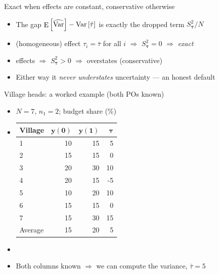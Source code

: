 \documentclass[table, xcolor = {dvipsnames}, 9pt]{beamer}
\theoremstyle{plain}
\newcommand{\mh}[1]{{\color{magenta}{#1}}}
\DeclareMathOperator{\E}{\rm{E}}
\DeclareMathOperator{\Var}{\rm{Var}}
\begin{document}
\begin{frame}[t]{Exact when effects are constant, conservative otherwise}
\vfill
\begin{itemize} \vfill
\item The gap $\E\left[\widehat{\Var}\right] - \Var\left[\hat{\tau}\right]$ is exactly the dropped term $S^2_{\bm{\tau}}/N$ \vfill
\item \mh{Constant} (homogeneous) effect $\tau_i = \bar{\tau}$ for all $i$ $\Rightarrow$ $S^2_{\bm{\tau}} = 0$ $\Rightarrow$ \emph{exact} \vfill
\item \mh{Varying} effects $\Rightarrow$ $S^2_{\bm{\tau}} > 0$ $\Rightarrow$ overstates (conservative) \vfill
\item Either way it \emph{never understates} uncertainty --- an honest default \vfill
\end{itemize} \vfill
\end{frame}
\begin{frame}[t]{Village heads: a worked example (both POs known)}
\vfill
\begin{itemize}
\item $N = 7$, $n_1 = 2$; budget share (\%) \citep[Ch.~2]{gerbergreen2012} \vfill 
\item[] \vfill 
\begin{center}
\small
\begin{tabular}{l|rrr} \hline
Village &$\bm{y}(\bm{0})$& $\bm{y}(\bm{1})$& $\bm{\tau}$  \\ \hline
1& 10 & 15  & 5  \\
2& 15 & 15  & 0   \\
3& 20 & 30  & 10   \\
4& 20 & 15  & -5   \\
5& 10 & 20  & 10   \\
6& 15 & 15  & 0   \\
7& 15 & 30  & 15   \\ \hline
Average & 15 & 20 & 5  \\ \hline
\end{tabular}
\end{center}
\item[] \vfill
\item Both columns known $\Rightarrow$ we can compute the \mh{true} variance, $\bar{\tau} = 5$ \vfill
\end{itemize} \vfill
\end{frame}
\end{document}
